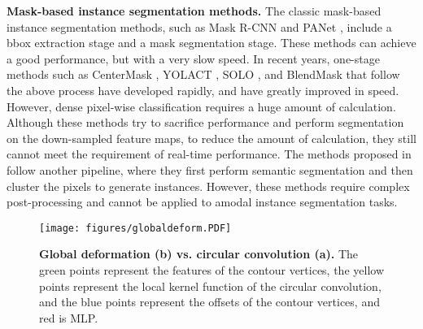 \documentclass[10pt,twocolumn,letterpaper]{article}
\begin{document}
\textbf{Mask-based instance segmentation methods.} The classic mask-based instance segmentation methods, such as Mask R-CNN \cite{maskrcnn} and PANet \cite{panet}, include a bbox extraction stage and a mask segmentation stage. These methods can achieve a good performance, but with a very slow speed. In recent years, one-stage methods such as CenterMask \cite{centermask}, YOLACT \cite{yolact}, SOLO \cite{solo}, and BlendMask \cite{blendmask} that follow the above process have developed rapidly, and have greatly improved in speed. However, dense pixel-wise classification requires a huge amount of calculation. Although these methods try to sacrifice performance and perform segmentation on the down-sampled feature maps, to reduce the amount of calculation, they still cannot meet the requirement of real-time performance. The methods proposed in \cite{ssap, spatial} follow another pipeline, where they first perform semantic segmentation and then cluster the pixels to generate instances. However, these methods require complex post-processing and cannot be applied to amodal instance segmentation tasks.
\begin{figure}[t]
\begin{minipage}[c]{0.5\linewidth}\vspace{-3mm}
\texttt{[image: figures/globaldeform.PDF]}
\end{minipage}\hfill
\begin{minipage}[c]{0.5\linewidth}
   \caption{\textbf{Global deformation (b) vs. circular convolution \cite{deepsnake} (a).} The green points represent the features of the contour vertices, the yellow points represent the local kernel function of the circular convolution, and the blue points represent the offsets of the contour vertices, and red is MLP.}
   \label{fig:global deformation}
\end{minipage}\vspace{-8mm}
\end{figure}
\end{document}
